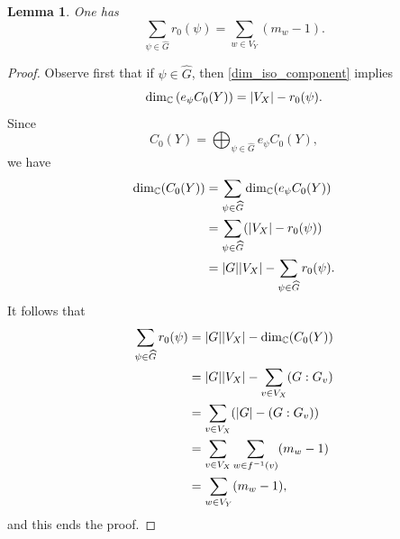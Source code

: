 \documentclass[11pt]{amsart}
\newtheorem{lemma}[theorem]{Lemma}
\numberwithin{equation}{section}
\theoremstyle{remark}
\theoremstyle{definition}
\newtheorem{example}[theorem]{Example}
\begin{document}
\begin{lemma} \label{sum_order}
One has
$$\sum_{\psi \in \widehat{G}} r_{0}(\psi) = \sum_{w \in V_{Y}}(m_{w} - 1). $$
\end{lemma}
\begin{proof}
Observe first that if $\psi \in \widehat{G}$, then \cref{dim_iso_component} implies
$${\rm dim}_{\mathbb{C}} \, (e_{\psi} C_{0}(Y)) = |V_{X}| - r_{0}(\psi). $$
Since
$$C_{0}(Y) = \bigoplus_{\psi \in \widehat{G}} e_{\psi} C_{0}(Y),$$
we have
\begin{equation*}
\begin{aligned} 
{\rm dim}_{\mathbb{C}} (C_{0}(Y)) &= \sum_{\psi \in \widehat{G}} {\rm dim}_{\mathbb{C}} (e_{\psi} C_{0}(Y)) \\
&= \sum_{\psi \in \widehat{G}} (|V_{X}| - r_{0}(\psi)) \\
&= |G||V_{X}| - \sum_{\psi \in \widehat{G}} r_{0}(\psi). \\
\end{aligned}
\end{equation*}
It follows that
\begin{equation*}
\begin{aligned}
\sum_{\psi \in \widehat{G}} r_{0}(\psi) &= |G||V_{X}| - {\rm dim}_{\mathbb{C}} (C_{0}(Y)) \\
&= |G||V_{X}| - \sum_{v \in V_{X}}(G:G_{v})\\
&= \sum_{v \in V_{X}}(|G| - (G:G_{v})) \\
&= \sum_{v \in V_{X}} \sum_{w \in f^{-1}(v)}(m_{w} - 1)  \\
&= \sum_{w \in V_{Y}} (m_{w} - 1),
\end{aligned}
\end{equation*}
and this ends the proof.
\end{proof}

\end{document}
